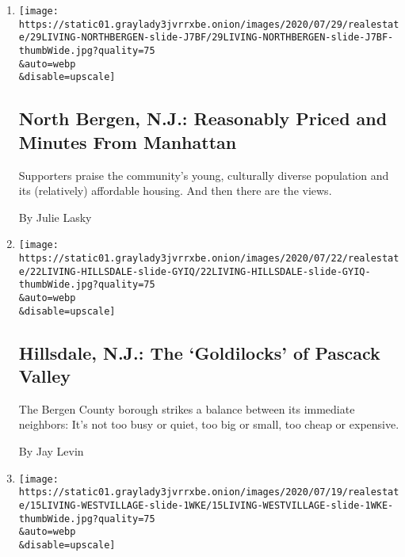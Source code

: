 \begin{enumerate}
\def\labelenumi{\arabic{enumi}.}
\item
  \href{/2020/07/29/realestate/north-bergen-nj-reasonably-priced-and-minutes-from-manhattan.html}{}

  \texttt{[image: https://static01.graylady3jvrrxbe.onion/images/2020/07/29/realestate/29LIVING-NORTHBERGEN-slide-J7BF/29LIVING-NORTHBERGEN-slide-J7BF-thumbWide.jpg?quality=75\\\&auto=webp\\\&disable=upscale]}

  \hypertarget{north-bergen-nj-reasonably-priced-and-minutes-from-manhattan}{%
  \subsection{North Bergen, N.J.: Reasonably Priced and Minutes From
  Manhattan}\label{north-bergen-nj-reasonably-priced-and-minutes-from-manhattan}}

  Supporters praise the community's young, culturally diverse population
  and its (relatively) affordable housing. And then there are the views.

  By Julie Lasky
\item
  \href{/2020/07/22/realestate/hillsdale-nj-pascack-valley.html}{}

  \texttt{[image: https://static01.graylady3jvrrxbe.onion/images/2020/07/22/realestate/22LIVING-HILLSDALE-slide-GYIQ/22LIVING-HILLSDALE-slide-GYIQ-thumbWide.jpg?quality=75\\\&auto=webp\\\&disable=upscale]}

  \hypertarget{hillsdale-nj-the-goldilocks-of-pascack-valley}{%
  \subsection{Hillsdale, N.J.: The `Goldilocks' of Pascack
  Valley}\label{hillsdale-nj-the-goldilocks-of-pascack-valley}}

  The Bergen County borough strikes a balance between its immediate
  neighbors: It's not too busy or quiet, too big or small, too cheap or
  expensive.

  By Jay Levin
\item
  \href{/2020/07/15/realestate/west-village-nyc.html}{}

  \texttt{[image: https://static01.graylady3jvrrxbe.onion/images/2020/07/19/realestate/15LIVING-WESTVILLAGE-slide-1WKE/15LIVING-WESTVILLAGE-slide-1WKE-thumbWide.jpg?quality=75\\\&auto=webp\\\&disable=upscale]}

  \hypertarget{the-west-village-a-pause-and-a-reset-for-a-coveted-area}{%
}
\end{enumerate}
